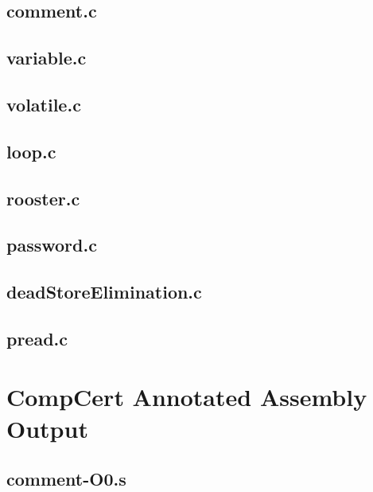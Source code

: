 \begin{appendices}
\subsection{comment.c}


\subsection{variable.c}


\subsection{volatile.c}


\subsection{loop.c}


\subsection{rooster.c}


\subsection{password.c}


\subsection{deadStoreElimination.c}


\subsection{pread.c}



\section{CompCert Annotated Assembly Output}
\lstset{language=[x64]Assembler}
\subsection{comment-O0.s}


\end{appendices}
